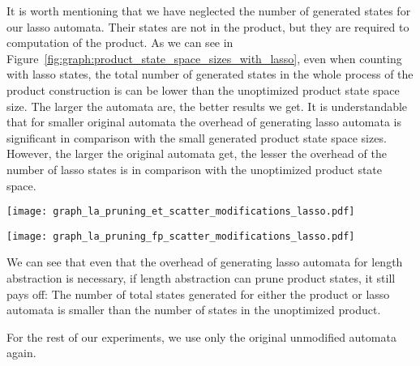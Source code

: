 It is worth mentioning that we have neglected the number of generated states for our lasso automata. Their states are not in the product, but they are required to computation of the product. As we can see in Figure~\ref{fig:graph:product_state_space_sizes_with_lasso}, even when counting with lasso states, the total number of generated states in the whole process of the product construction is can be lower than the unoptimized product state space size. The larger the automata are, the better results we get. It is understandable that for smaller original automata the overhead of generating lasso automata is significant in comparison with the small generated product state space sizes. However, the larger the original automata get, the lesser the overhead of the number of lasso states is in comparison with the unoptimized product state space.

\begin{figure*}[ht]
    \centering
    \begin{minipage}{0.49\linewidth}
        \centering
        \texttt{[image: graph\_la\_pruning\_et\_scatter\_modifications\_lasso.pdf]}
        \caption{Emptiness problem.}
        \label{fig:graph:et_state_space_sizes_comp_with_lasso}
    \end{minipage}
    \hfill
    \begin{minipage}{0.49\linewidth}
        \centering
        \texttt{[image: graph\_la\_pruning\_fp\_scatter\_modifications\_lasso.pdf]}
        \caption{Product construction.}
        \label{fig:graph:fp_state_space_sizes_comp_with_lasso}
    \end{minipage}
    \vspace{0.5cm}
    \caption{Comparison of state space sizes in unoptimized product and product optimized by length abstraction with a sum of states generated for both lasso automata. Both axes are in symmetrical logarithmic scale, x-axis showing the number of states in the unoptimized product, y-axis the number of states in the optimized product.}
    \label{fig:graph:product_state_space_sizes_with_lasso}
\end{figure*}

We can see that even that the overhead of generating lasso automata for length abstraction is necessary, if length abstraction can prune product states, it still pays off: The number of total states generated for either the product or lasso automata is smaller than the number of states in the unoptimized product.

For the rest of our experiments, we use only the original unmodified automata again.


